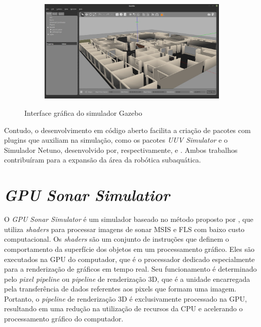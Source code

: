\begin{figure}[H]
\begin{subfigure}[t]{0.47\textwidth}
    \end{subfigure}
    \begin{subfigure}[t]{0.47\textwidth}
        \includegraphics[width=\textwidth]{dados/figuras/gazebo4.jpeg}
    \end{subfigure}
    \caption{Interface gráfica do simulador Gazebo}
    \label{fig:gazebo}
\end{figure}

Contudo, o desenvolvimento em código aberto facilita a criação de pacotes com plugins que auxiliam na simulação, como os pacotes \textit{UUV Simulator} e o Simulador Netuno, desenvolvido por, respectivamente, \cite{manhaes2016uuv} e \cite{longaray2017}. Ambos trabalhos contribuíram para a expansão da área da robótica subaquática.

\section{\textit{GPU Sonar Simulatior}}
\label{sec:gpu_sonar_sim}

O \textit{GPU Sonar Simulator} é um simulador baseado no método proposto por \cite{cerqueira2016gpu}, que utiliza \textit{shaders} para processar imagens de sonar MSIS e FLS com baixo custo computacional. 
Os \textit{shaders} são um conjunto de instruções que definem o comportamento da superfície dos objetos em um processamento gráfico.
Eles são executados na GPU do computador, que é o processador dedicado especialmente para a renderização de gráficos em tempo real. 
Seu funcionamento é determinado pelo \textit{pixel pipeline} ou \textit{pipeline} de renderização 3D, que é a unidade encarregada pela transferência de dados referentes aos pixels que formam uma imagem. 
Portanto, o \textit{pipeline} de renderização 3D é exclusivamente processado na GPU, resultando em uma redução na utilização de recursos da CPU e acelerando o processamento gráfico do computador. 

